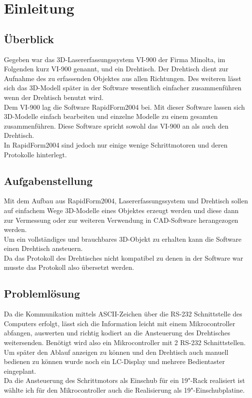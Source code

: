 \documentclass[11pt,twoside]{report}
\begin{document}
\pagestyle{fancy} 
\thispagestyle{fancy}
\tableofcontents 	\newpage
\listoffigures 		\newpage
\listoftables		\newpage
\newpage

\section{Einleitung}
\subsection{Überblick}
Gegeben war das 3D-Lasererfassungssystem VI-900 der Firma Minolta, im Folgenden kurz VI-900 genannt, und ein Drehtisch. Der Drehtisch dient zur Aufnahme des zu erfassenden Objektes aus allen Richtungen. Des weiteren lässt sich das 3D-Modell später in der Software wesentlich einfacher zusammenführen wenn der Drehtisch benutzt wird.\\
Dem VI-900 lag die Software RapidForm2004 bei. Mit dieser Software lassen sich 3D-Modelle einfach bearbeiten und einzelne Modelle zu einem gesamten zusammenführen. Diese Software spricht sowohl das VI-900 an als auch den Drehtisch. \\
In RapidForm2004 sind jedoch nur einige wenige Schrittmotoren und deren Protokolle hinterlegt.
\subsection{Aufgabenstellung}
Mit dem Aufbau aus RapidForm2004, Lasererfassungssystem und Drehtisch sollen auf einfachem Wege 3D-Modelle eines Objektes erzeugt werden und diese dann zur Vermessung oder zur weiteren Verwendung in CAD-Software herangezogen werden.\\
Um ein vollständiges und brauchbares 3D-Objekt zu erhalten kann die Software einen Drehtisch ansteuern.\\
Da das Protokoll des Drehtisches nicht kompatibel zu denen in der Software war musste das Protokoll also übersetzt werden.
\subsection{Problemlösung}
Da die Kommunikation mittels ASCII-Zeichen über die RS-232 Schnittstelle des Computers erfolgt, lässt sich die Information leicht mit einem Mikrocontroller abfangen, auswerten und richtig kodiert an die Ansteuerung des Drehtisches weitersenden.
Benötigt wird also ein Mikrocontroller mit 2 RS-232 Schnittstellen. Um später den Ablauf anzeigen zu können und den Drehtisch auch manuell bedienen zu können wurde noch ein LC-Display und mehrere Bedientaster eingeplant.\\
Da die Ansteuerung des Schrittmotors als Einschub für ein 19"-Rack realisiert ist wählte ich für den Mikrocontroller auch die Realisierung als 19"-Einschubplatine.  
\newpage
\end{document}
